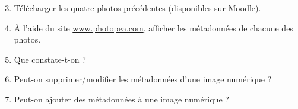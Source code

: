 \documentclass[a4paper]{article}
\begin{document}
\begin{enumerate}
  \setcounter{enumi}{2}
  \item Télécharger les quatre photos précédentes (disponibles sur Moodle).
  \item À l'aide du site \url{www.photopea.com}, afficher les métadonnées de chacune des photos.
  \item Que constate-t-on ?
  \item Peut-on supprimer/modifier les métadonnées d'une image numérique ?
  \item Peut-on ajouter des métadonnées à une image numérique ?
\end{enumerate}
\end{document}
